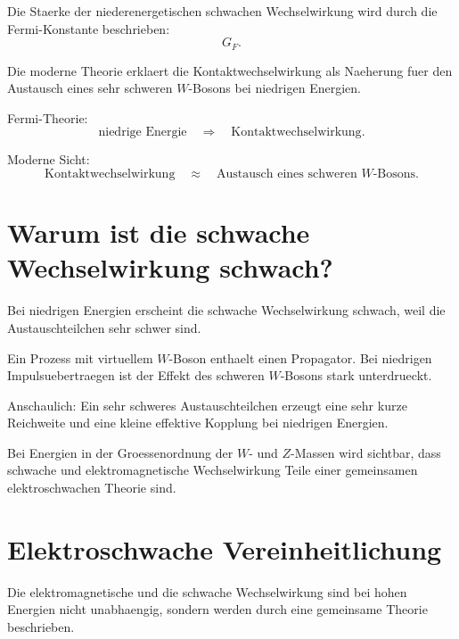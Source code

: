 \begin{formulabox}
Die Staerke der niederenergetischen schwachen Wechselwirkung wird durch die
Fermi-Konstante beschrieben:
\[
    G_F.
\]
\end{formulabox}

\begin{notebox}
Die moderne Theorie erklaert die Kontaktwechselwirkung als Naeherung fuer den
Austausch eines sehr schweren $W$-Bosons bei niedrigen Energien.
\end{notebox}

\begin{examtipbox}
Fermi-Theorie:
\[
    \text{niedrige Energie}
    \quad\Rightarrow\quad
    \text{Kontaktwechselwirkung}.
\]

Moderne Sicht:
\[
    \text{Kontaktwechselwirkung}
    \quad\approx\quad
    \text{Austausch eines schweren } W\text{-Bosons}.
\]
\end{examtipbox}

\section{Warum ist die schwache Wechselwirkung schwach?}

Bei niedrigen Energien erscheint die schwache Wechselwirkung schwach, weil die
Austauschteilchen sehr schwer sind.

\begin{conceptbox}
Ein Prozess mit virtuellem $W$-Boson enthaelt einen Propagator.
Bei niedrigen Impulsuebertraegen ist der Effekt des schweren $W$-Bosons stark
unterdrueckt.

Anschaulich:
Ein sehr schweres Austauschteilchen erzeugt eine sehr kurze Reichweite und eine
kleine effektive Kopplung bei niedrigen Energien.
\end{conceptbox}

\begin{notebox}
Bei Energien in der Groessenordnung der $W$- und $Z$-Massen wird sichtbar, dass
schwache und elektromagnetische Wechselwirkung Teile einer gemeinsamen
elektroschwachen Theorie sind.
\end{notebox}

\section{Elektroschwache Vereinheitlichung}

Die elektromagnetische und die schwache Wechselwirkung sind bei hohen Energien
nicht unabhaengig, sondern werden durch eine gemeinsame Theorie beschrieben.


